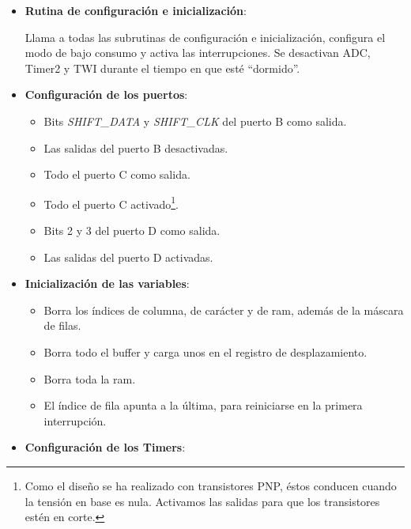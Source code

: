 \begin{itemize}
\item{\textbf{Rutina de configuración e inicialización}:
  

Llama a todas las subrutinas de configuración e inicialización, configura el modo de bajo consumo y activa las interrupciones. Se desactivan ADC, Timer2 y TWI durante el tiempo en que esté ``dormido''.
}

\item{\textbf{Configuración de los puertos}:
  

  \begin{itemize}
    \item{Bits \textit{SHIFT\_DATA} y \textit{SHIFT\_CLK} del puerto B como salida.}
    \item{Las salidas del puerto B desactivadas.}
    \item{Todo el puerto C como salida.}
    \item{Todo el puerto C activado\footnote{Como el diseño se ha realizado con transistores PNP, éstos conducen cuando la tensión en base es nula. Activamos las salidas para que los transistores estén en corte.}.}
    \item{Bits 2 y 3 del puerto D como salida.}
    \item{Las salidas del puerto D activadas.}
  \end{itemize}
}

\item{\textbf{Inicialización de las variables}:
  

  \begin{itemize}
  \item{Borra los índices de columna, de carácter y de ram, además de la máscara de filas.}
  \item{Borra todo el buffer y carga unos en el registro de desplazamiento.}
  \item{Borra toda la ram.}
  \item{El índice de fila apunta a la última, para reiniciarse en la primera interrupción.}
  \end{itemize}
}

\item{\textbf{Configuración de los Timers}:
  

}
\end{itemize}
